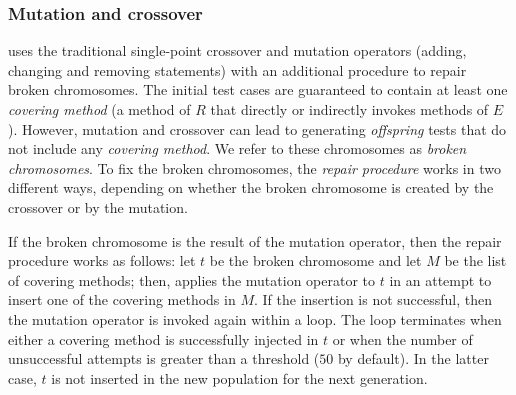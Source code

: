 

\subsubsection{Mutation and crossover}\label{sec:mutation_and_crossover} \cling uses the traditional single-point crossover and mutation operators (adding, changing and removing  statements) \cite{Fraser2011} with an additional procedure to repair broken chromosomes. The initial test cases are guaranteed to contain at least one \textit{covering method} (a method of $R$ that directly or indirectly invokes methods of $E$). However, mutation and crossover can lead to generating \textit{offspring} tests that do not include any \textit{covering method}. We refer to these chromosomes as \textit{broken chromosomes}. To fix the broken chromosomes, the \textit{repair procedure} works in two different ways, depending on whether the broken chromosome is created by the crossover or by the mutation. 

If the broken chromosome is the result of the mutation operator, then the repair procedure works as follows: let $t$ be the broken chromosome and let $M$ be the list of covering methods; then, \cling applies the mutation operator to $t$ in an attempt to insert one of the covering methods in $M$. If the insertion is not successful, then the mutation operator is invoked again within a loop. The loop terminates when either a covering method is successfully injected in $t$ or when the number of unsuccessful attempts is greater than a threshold ($50$ by default). In the latter case, $t$ is not inserted in the new population for the next generation.

